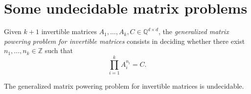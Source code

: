 \section{Some undecidable matrix problems}

\label{matrix-undecidability}

Given $k+1$ invertible matrices $A_{1}, \ldots, A_{k},C \in \mathbb{Q}^{d \times d}$, the \emph{generalized matrix powering problem for invertible matrices} consists in deciding whether there exist $n_{1}, \ldots, n_{k} \in \mathbb{Z}$ such that
\begin{equation*}
\prod\limits_{i=1}^{k} A_{i}^{n_{i}} = C.
\end{equation*}

\begin{theorem}
The generalized matrix powering problem for invertible matrices is undecidable.
\end{theorem}

